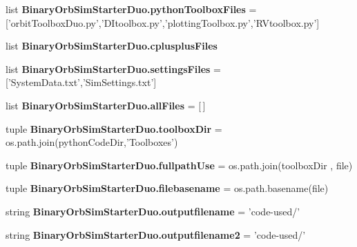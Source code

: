 \begin{DoxyCompactItemize}
\item 
list {\bf Binary\-Orb\-Sim\-Starter\-Duo.\-python\-Toolbox\-Files} = ['orbit\-Toolbox\-Duo.\-py','D\-Itoolbox.\-py','plotting\-Toolbox.\-py','R\-Vtoolbox.\-py']
\item 
list {\bf Binary\-Orb\-Sim\-Starter\-Duo.\-cplusplus\-Files}
\item 
list {\bf Binary\-Orb\-Sim\-Starter\-Duo.\-settings\-Files} = ['System\-Data.\-txt','Sim\-Settings.\-txt']
\item 
list {\bf Binary\-Orb\-Sim\-Starter\-Duo.\-all\-Files} = [$\,$]
\item 
tuple {\bf Binary\-Orb\-Sim\-Starter\-Duo.\-toolbox\-Dir} = os.\-path.\-join(python\-Code\-Dir,'Toolboxes')
\item 
tuple {\bf Binary\-Orb\-Sim\-Starter\-Duo.\-fullpath\-Use} = os.\-path.\-join(toolbox\-Dir , file)
\item 
tuple {\bf Binary\-Orb\-Sim\-Starter\-Duo.\-filebasename} = os.\-path.\-basename(file)
\item 
string {\bf Binary\-Orb\-Sim\-Starter\-Duo.\-outputfilename} = 'code-\/used/'
\item 
string {\bf Binary\-Orb\-Sim\-Starter\-Duo.\-outputfilename2} = 'code-\/used/'
\end{DoxyCompactItemize}
